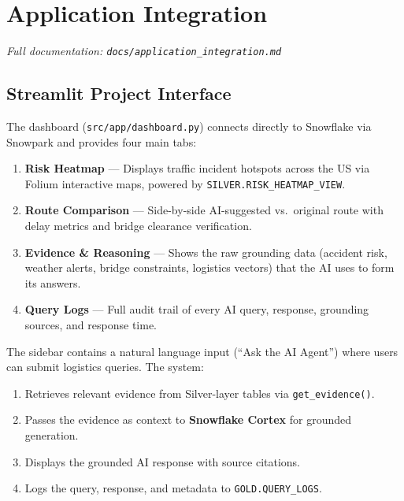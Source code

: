 \documentclass[14.5pt,letterpaper]{article}
\begin{document}
\newpage
\section{Application Integration}
\label{app:application}

\noindent\textit{Full documentation: \texttt{docs/application\_integration.md}}

\subsection{Streamlit Project Interface}

The dashboard (\texttt{src/app/dashboard.py}) connects directly to Snowflake via Snowpark and provides four main tabs:

\begin{enumerate}
    \item \textbf{Risk Heatmap} --- Displays traffic incident hotspots across the US via Folium interactive maps, powered by \texttt{SILVER.RISK\_HEATMAP\_VIEW}.
    \item \textbf{Route Comparison} --- Side-by-side AI-suggested vs.\ original route with delay metrics and bridge clearance verification.
    \item \textbf{Evidence \& Reasoning} --- Shows the raw grounding data (accident risk, weather alerts, bridge constraints, logistics vectors) that the AI uses to form its answers.
    \item \textbf{Query Logs} --- Full audit trail of every AI query, response, grounding sources, and response time.
\end{enumerate}

The sidebar contains a natural language input (``Ask the AI Agent'') where users can submit logistics queries. The system:
\begin{enumerate}
    \item Retrieves relevant evidence from Silver-layer tables via \texttt{get\_evidence()}.
    \item Passes the evidence as context to \textbf{Snowflake Cortex} for grounded generation.
    \item Displays the grounded AI response with source citations.
    \item Logs the query, response, and metadata to \texttt{GOLD.QUERY\_LOGS}.
\end{enumerate}
\end{document}
